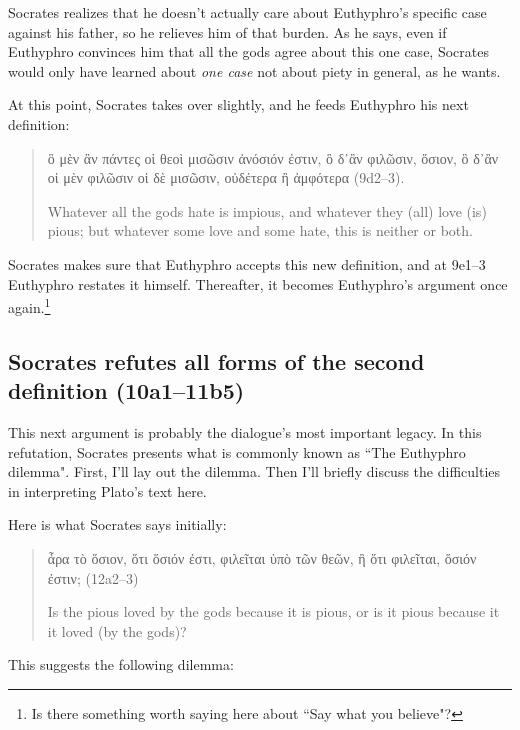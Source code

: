 \documentclass[11pt]{article}
\begin{document}
Socrates realizes that he doesn't actually care about Euthyphro's specific
case against his father, so he relieves him of that burden.  As he says,
even if Euthyphro convinces him that all the gods agree about this one
case, Socrates would only have learned about \emph{one case} not about
piety in general, as he wants.

At this point, Socrates takes over slightly, and he feeds Euthyphro his
next definition:

\begin{quote}
    ὃ μὲν ἂν πάντες οἱ θεοὶ μισῶσιν ἀνόσιόν ἐστιν, ὃ δ᾽ἂν φιλῶσιν, ὅσιον,
    ὃ δ᾽ἂν οἱ μὲν φιλῶσιν οἱ δὲ μισῶσιν, οὐδέτερα ἢ ἀμφότερα (9d2--3).

    Whatever all the gods hate is impious, and whatever they (all) love
    (is) pious; but whatever some love and some hate, this is neither or
    both.
\end{quote}

Socrates makes sure that Euthyphro accepts this new definition, and at
9e1--3 Euthyphro restates it himself.  Thereafter, it becomes Euthyphro's
argument once again.\footnote{Is there something worth saying here about
``Say what you believe"?}

\subsection{Socrates refutes all forms of the second definition (10a1--11b5)}

This next argument is probably the dialogue's most important legacy.  In
this refutation, Socrates presents what is commonly known as ``The
Euthyphro dilemma".  First, I'll lay out the dilemma.  Then I'll briefly
discuss the difficulties in interpreting Plato's text here.

Here is what Socrates says initially:

\begin{quote}
    ἆρα τὸ ὅσιον, ὅτι ὅσιόν ἐστι, φιλεῖται ὑπὸ τῶν θεῶν, ἢ ὅτι φιλεῖται,
    ὅσιόν ἐστιν; (12a2--3)

    Is the pious loved by the gods because it is pious, or is it pious
    because it it loved (by the gods)?
\end{quote}

This suggests the following dilemma:
\end{document}
